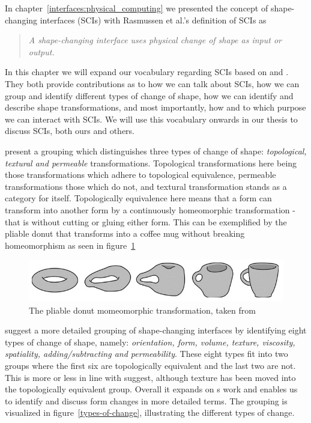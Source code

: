 \label{ch:jamming:vocabulary}
In chapter~\ref{interfaces:physical_computing} we presented the concept of shape-changing interfaces (SCIs) with Rasmussen et al.'s \citep{rasmussen2012shape} definition of SCIs as

\begin{quotation}
  \emph{A shape-changing interface uses physical change of shape as input or output. \citep{rasmussen2012shape}} 
\end{quotation}
In this chapter we will expand our vocabulary regarding SCIs based on \citet{coelho2011shape} and \citet{rasmussen2012shape}.
They both provide contributions as to how we can talk about SCIs, how we can group and identify different types of change of shape, how we can identify and describe shape transformations, and most importantly, how and to which purpose we can interact with SCIs.
We will use this vocabulary onwards in our thesis to discuss SCIs, both ours and others.   

\citeauthor{coelho2011shape} present a grouping which distinguishes three types of change of shape: \emph{topological, textural and permeable} transformations.
Topological transformations here being those transformations which adhere to topological equivalence, permeable transformations those which do not, and textural transformation stands as a category for itself.
Topologically equivalence here means that a form can transform into another form by a continuously homeomorphic transformation - that is without cutting or gluing either form.
This can be exemplified by the pliable donut that transforms into a coffee mug without breaking homeomorphism as seen in figure~\ref{pliable-mug} 

\begin{figure}[h]
  \centering
  \includegraphics[width=0.9\linewidth]{figures/pliable-donut}
	\caption{The pliable donut momeomorphic transformation, taken from \citep{coelho2011shape}}
   \label{pliable-mug}
\end{figure}   
 
\citeauthor{rasmussen2012shape} suggest a more detailed grouping of shape-changing interfaces by identifying eight types of change of shape, namely: \textit{orientation, form, volume, texture, viscosity, spatiality, adding/subtracting and permeability}.
These eight types fit into two groups where the first six are topologically equivalent and the last two are not.
This is more or less in line with \citeauthor{coelho2011shape} suggest, although texture has been moved into the topologically equivalent group. Overall it expands on \citeauthor{coelho2011shape}s work and enables us to identify and discuss form changes in more detailed terms.
The grouping is visualized in figure~\ref{types-of-change}, illustrating the different types of change.

